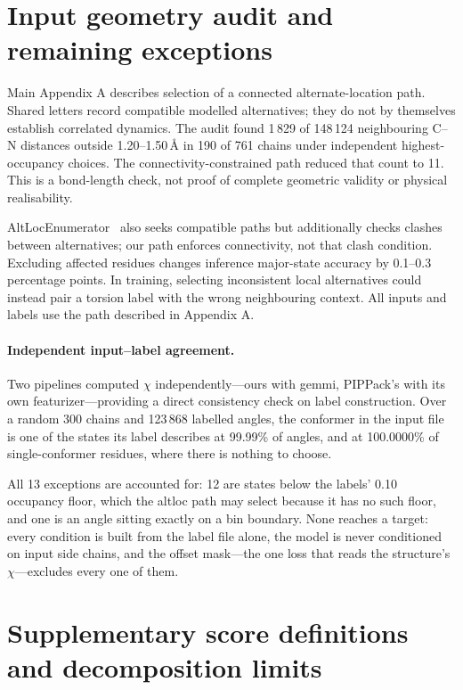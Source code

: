 \documentclass[10pt,a4paper]{article}
\begin{document}
\section{Input geometry audit and remaining exceptions}
\label{sec:viterbi}

Main Appendix A describes selection of a connected alternate-location path. Shared letters record compatible modelled alternatives; they do not by themselves establish correlated dynamics. The audit found 1\,829 of 148\,124 neighbouring C--N distances outside 1.20--1.50\,\AA{} in 190 of 761 chains under independent highest-occupancy choices. The connectivity-constrained path reduced that count to 11. This is a bond-length check, not proof of complete geometric validity or physical realisability.

AltLocEnumerator~\citep{gutermuth2023altloc} also seeks compatible paths but additionally checks clashes between alternatives; our path enforces connectivity, not that clash condition. Excluding affected residues changes inference major-state accuracy by 0.1--0.3 percentage points. In training, selecting inconsistent local alternatives could instead pair a torsion label with the wrong neighbouring context. All inputs and labels use the path described in Appendix A.

\paragraph{Independent input--label agreement.}
\label{sec:consistency}

Two pipelines computed $\chi$ independently---ours with gemmi, PIPPack's with its
own featurizer---providing a direct consistency check on label
construction. Over a random 300 chains and 123\,868 labelled angles, the conformer
in the input file is one of the states its label describes at 99.99\% of angles,
and at 100.0000\% of single-conformer residues, where there is nothing to choose.

All 13 exceptions are accounted for: 12 are states below the labels' 0.10
occupancy floor, which the altloc path may select because it has no such floor,
and one is an angle sitting exactly on a bin boundary. None reaches a target: every
condition is built from the label file alone, the model is never
conditioned on input side chains, and the offset mask---the one loss that reads
the structure's $\chi$---excludes every one of them.

\section{Supplementary score definitions and decomposition limits}
\label{sec:protocol}
\end{document}
